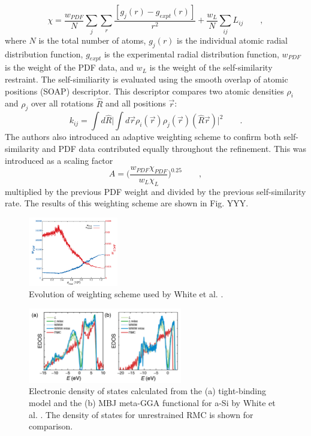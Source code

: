 \documentclass[3p,review,12pt]{elsarticle}
\begin{document}
\begin{equation}
\chi = \frac{w_{PDF}}{N}\sum_{j}\sum_{r} \frac{[g_{j}(r)-g_{expt}(r)]}{r^{2}}+\frac{w_{L}}{N}\sum_{ij}L_{ij} \qquad ,
\end{equation}
where $N$ is the total number of atoms, $g_{j}(r)$ is the individual atomic radial distribution function, $g_{expt}$ is the experimental radial distribution function, $w_{PDF}$ is the weight of the PDF data, and $w_{L}$ is the weight of the self-similarity restraint. The self-similiarity is evaluated using the smooth overlap of atomic positions (SOAP) descriptor. This descriptor compares two atomic densities $\rho_{i}$ and $\rho_{j}$ over all rotations $\hat{R}$ and all positions $\vec{r}$:
\begin{equation}
k_{ij} = \int d \hat{R} \Bigg|\int d\vec{r}\rho_{i}(\vec{r})\rho_{j}(\vec{r})(\hat{R}\vec{r})\Bigg|^{2} \qquad .
\end{equation}
The authors also introduced an adaptive weighting scheme to confirm both self-similarity and PDF data contributed equally throughout the refinement. This was introduced as a scaling factor
\begin{equation}
A=\bigg(\frac{w_{PDF}\chi_{PDF}}{w_{L}\chi_{L}}\bigg)^{0.25} \qquad ,
\end{equation}
multiplied by the previous PDF weight and divided by the previous self-similarity rate. The results of this weighting scheme are shown in Fig. YYY. 

\begin{figure}[H]
	\includegraphics[width=0.35\textwidth]{white1}
	\centering
	\caption{Evolution of weighting scheme used by White et al. \cite{White2014}.}
\end{figure}

\begin{figure}[H]
	\includegraphics[width=0.6\textwidth]{white2}
	\centering
	\caption{Electronic density of states calculated from the (a) tight-binding model and the (b) MBJ meta-GGA functional for a-Si by White et al. \cite{White2014}. The density of states for unrestrained RMC is shown for comparison.}
\end{figure}
\end{document}
